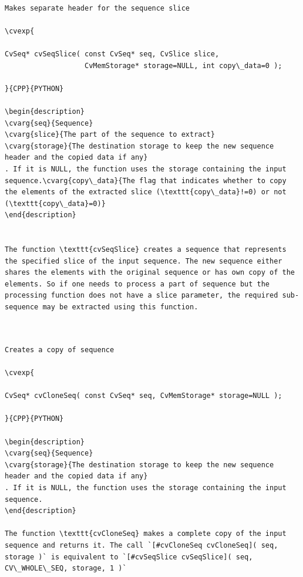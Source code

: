\label{SeqSlice}
\begin{verbatim}

Makes separate header for the sequence slice

\cvexp{

CvSeq* cvSeqSlice( const CvSeq* seq, CvSlice slice,
                   CvMemStorage* storage=NULL, int copy\_data=0 );

}{CPP}{PYTHON}

\begin{description}
\cvarg{seq}{Sequence}
\cvarg{slice}{The part of the sequence to extract}
\cvarg{storage}{The destination storage to keep the new sequence header and the copied data if any}
. If it is NULL, the function uses the storage containing the input sequence.\cvarg{copy\_data}{The flag that indicates whether to copy the elements of the extracted slice (\texttt{copy\_data}!=0) or not (\texttt{copy\_data}=0)}
\end{description}


The function \texttt{cvSeqSlice} creates a sequence that represents the specified slice of the input sequence. The new sequence either shares the elements with the original sequence or has own copy of the elements. So if one needs to process a part of sequence but the processing function does not have a slice parameter, the required sub-sequence may be extracted using this function.


\end{verbatim}
\label{CloneSeq}
\begin{verbatim}

Creates a copy of sequence

\cvexp{

CvSeq* cvCloneSeq( const CvSeq* seq, CvMemStorage* storage=NULL );

}{CPP}{PYTHON}

\begin{description}
\cvarg{seq}{Sequence}
\cvarg{storage}{The destination storage to keep the new sequence header and the copied data if any}
. If it is NULL, the function uses the storage containing the input sequence.
\end{description}

The function \texttt{cvCloneSeq} makes a complete copy of the input sequence and returns it. The call `[#cvCloneSeq cvCloneSeq]( seq, storage )` is equivalent to `[#cvSeqSlice cvSeqSlice]( seq, CV\_WHOLE\_SEQ, storage, 1 )`


\end{verbatim}
